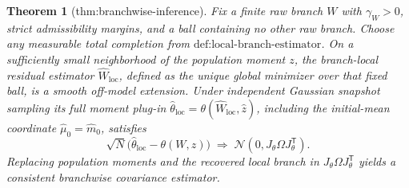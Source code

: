 \documentclass{article}
\newtheorem{theorem}{Theorem}
\begin{document}
\begin{theorem}[thm:branchwise-inference]\label{thm:branchwise-inference}
Fix a finite raw branch \(W\) with \(\gamma_W>0\), strict admissibility margins, and a ball containing no other raw branch. Choose any measurable total completion from \(\text{def:local-branch-estimator}\). On a sufficiently small neighborhood of the population moment \(z\), the branch-local residual estimator \(\widehat W_{\mathrm{loc}}\), defined as the unique global minimizer over that fixed ball, is a smooth off-model extension. Under independent Gaussian snapshot sampling its full moment plug-in \(\widehat\theta_{\mathrm{loc}}=\theta(\widehat W_{\mathrm{loc}},\widehat z)\), including the initial-mean coordinate \(\widehat\mu_0=\widehat m_0\), satisfies \[\sqrt N\bigl(\widehat\theta_{\mathrm{loc}}-\theta(W,z)\bigr)\;\Longrightarrow\;\mathcal N(0,J_\theta\Omega J_\theta^{\mathsf T}).\] Replacing population moments and the recovered local branch in \(J_\theta\Omega J_\theta^{\mathsf T}\) yields a consistent branchwise covariance estimator.
\end{theorem}
\end{document}

